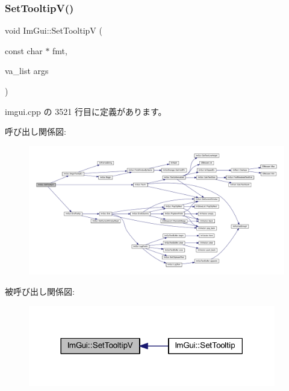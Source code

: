 \subsubsection{\texorpdfstring{Set\+Tooltip\+V()}{SetTooltipV()}}
{\footnotesize\ttfamily void Im\+Gui\+::\+Set\+TooltipV (\begin{DoxyParamCaption}\item[{const char $\ast$}]{fmt,  }\item[{va\+\_\+list}]{args }\end{DoxyParamCaption})}



 imgui.\+cpp の 3521 行目に定義があります。

呼び出し関係図\+:\nopagebreak
\begin{figure}[H]
\begin{center}
\leavevmode
\includegraphics[width=350pt]{namespace_im_gui_a3826acf68fc4a12bb66401575f51d6a2_cgraph}
\end{center}
\end{figure}
被呼び出し関係図\+:\nopagebreak
\begin{figure}[H]
\begin{center}
\leavevmode
\includegraphics[width=306pt]{namespace_im_gui_a3826acf68fc4a12bb66401575f51d6a2_icgraph}
\end{center}
\end{figure}
\mbox{\label{namespace_im_gui_ab5445711a74e0e1a58d1e464cdda252f}} 
